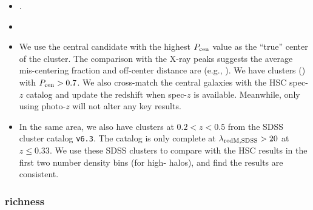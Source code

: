 \documentclass[fleqn,usenatbib,useAMS,english]{mnras}
\begin{document}
\begin{itemize}
        \item {}.

        \item {}

        \item We use the central candidate with the highest $P_{\rm cen}$ value as the
            ``true'' center of the cluster.
            The comparison with the X-ray peaks suggests the average mis-centering
            fraction and off-center distance are  (e.g., \addref{}).
            We have  clusters () with $P_{\rm cen} > 0.7$.
            We also cross-match the central galaxies with the HSC spec-$z$ catalog and
            update the redshift when spec-$z$ is available.
            Meanwhile, only using \redm{} photo-$z$ will not alter any key results.

        \item In the same area, we also have  clusters at $0.2 < z < 0.5$ from
            the SDSS \redm{} cluster catalog \texttt{v6.3}.
            The catalog is only complete at $\lambda_{\rm redM, SDSS} > 20$ at
            $z \leq 0.33$.
            We use these SDSS \redm{} clusters to compare with the
            HSC results in the first two number density bins (for high-\mvir{} halos),
            and find the results are consistent.

    \end{itemize}

\subsubsection{\camira{} richness}
    \label{sec:camira}

\end{document}

